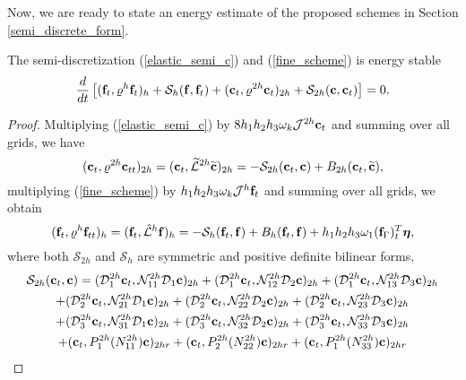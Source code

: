  Now, we are ready to state an energy estimate of the proposed schemes in Section \ref{semi_discrete_form}. 
 \begin{theorem}
  The semi-discretization (\ref{elastic_semi_c}) and (\ref{fine_scheme}) is energy stable 
  \[
  \frac{d}{dt}\left[({\bf f}_t,\varrho^h {\bf f}_t)_{h} + \mathcal{S}_{h}({\bf f},{\bf f}_t) + ({\bf c}_t,\varrho^{2h} {\bf c}_t)_{2h} + \mathcal{S}_{2h}({\bf c},{\bf c}_t) \right]   = 0.
  \]
 \end{theorem}
 \begin{proof}
 Multiplying (\ref{elastic_semi_c}) by $8h_1h_2h_3\omega_k{\mathcal J}^{2h}{\bf c}_t$ and summing over all grids, we have
\begin{equation}\label{coarse_simple}
({\bf c}_t, {\varrho}^{2h}{\bf c}_{tt})_{2h} = ({\bf c}_t,\wt{\mathcal{L}}^{2h}\wt{{\bf c}})_{2h} = -\mathcal{S}_{2h}({\bf c}_t,{\bf c}) + B_{2h}({\bf c}_t,\wt{{\bf c}}),
\end{equation}
multiplying (\ref{fine_scheme}) by $h_1h_2h_3\omega_k{\mathcal J}^h{\bf f}_t$ and summing over all grids, we obtain
\begin{equation*}
({\bf f}_t, {\varrho}^h{\bf f}_{tt})_h = ({\bf f}_t,\hat{\mathcal{L}}^h{\bf f})_h = -\mathcal{S}_{h}({\bf f}_t,{\bf f}) + B_h({\bf f}_t,{\bf f}) 
+h_1h_2h_3\omega_1({\bf f}_\Gamma)_t^T{\bm \eta},
\end{equation*}
where  both $\mathcal{S}_{2h}$ and $\mathcal{S}_{h}$ are symmetric and positive definite bilinear forms, 
\begin{multline*}
\mathcal{S}_{2h}({\bf c}_t,{\bf c}) = (\mathcal{D}_1^{2h}{\bf c}_t,\mathcal{N}_{11}^{2h}\mathcal{D}_1{\bf c})_{2h} +  (\mathcal{D}_1^{2h}{\bf c}_t,\mathcal{N}_{12}^{2h}\mathcal{D}_2{\bf c})_{2h} +  (\mathcal{D}_1^{2h}{\bf c}_t,\mathcal{N}_{13}^{2h}\mathcal{D}_3{\bf c})_{2h}\\
 +  (\mathcal{D}_2^{2h}{\bf c}_t,\mathcal{N}_{21}^{2h}\mathcal{D}_1{\bf c})_{2h} 
+  (\mathcal{D}_2^{2h}{\bf c}_t,\mathcal{N}_{22}^{2h}\mathcal{D}_2{\bf c})_{2h} +  (\mathcal{D}_2^{2h}{\bf c}_t,\mathcal{N}_{23}^{2h}\mathcal{D}_3{\bf c})_{2h} \\
+  (\mathcal{D}_3^{2h}{\bf c}_t,\mathcal{N}_{31}^{2h}\mathcal{D}_1{\bf c})_{2h} 
+  (\mathcal{D}_3^{2h}{\bf c}_t,\mathcal{N}_{32}^{2h}\mathcal{D}_2{\bf c})_{2h} +  (\mathcal{D}_3^{2h}{\bf c}_t,\mathcal{N}_{33}^{2h}\mathcal{D}_3{\bf c})_{2h}\\
+ ({\bf c}_t, P^{2h}_1(N_{11}^{2h}){\bf c})_{2hr} + ({\bf c}_t, P^{2h}_2(N_{22}^{2h}){\bf c})_{2hr} + ({\bf c}_t, P^{2h}_1(N_{33}^{2h}){\bf c})_{2hr}

\end{multline*}
\end{proof}
